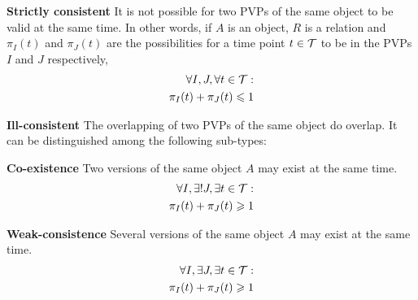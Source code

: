 \begin{definition}
\textbf{Strictly consistent} It is not possible for two PVPs of the same object to be valid at the same time. In other words, if $A$ is an object, $R$ is a relation and $\pi_{I}\left(t \right)$ and $\pi_{J}\left(t \right)$ are the possibilities for a time point $t \in \mathcal{T}$ to be in the PVPs $I$ and $J$ respectively,
\begin{align}
\label{eq:stricly-consistent}
\forall I,J, \forall t \in \mathcal{T} :\\
\nonumber
\pi_{I}(t) + \pi_{J}(t) \leqslant 1
\end{align}
\end{definition}




\begin{definition}
 \textbf{Ill-consistent} The overlapping of two PVPs of the same object do overlap. It can be distinguished among the following sub-types:
\end{definition}
	      \begin{definition}
	      \textbf{Co-existence} Two versions of the same object $A$ may exist at the same time.
		      \begin{align}
		      \label{eq:co-existence}
		      \forall I, \exists ! J, \exists t \in \mathcal{T} : \\
		      \nonumber
		      \pi_{I}(t) + \pi_{J}(t) \geqslant 1
		      \end{align}
	      \end{definition}


	      \begin{definition}
	      \textbf{Weak-consistence} Several versions of the same object $A$ may exist at the same time.
		      \begin{align}
		      \label{eq:weak-consistence}
		      \forall I, \exists J, \exists t \in \mathcal{T} : \\
		      \nonumber
		      \pi_{I}(t) + \pi_{J}(t) \geqslant 1
		      \end{align}
	      \end{definition}

